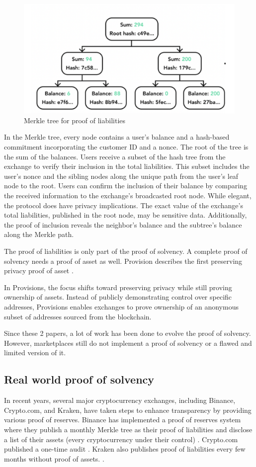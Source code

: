 \begin{figure}[H]
\centering
\includegraphics[width=130mm]{MerkleTreeLiabilities.png}
\caption{Merkle tree for proof of liabilities}
\label{overflow}
\end{figure}


In the Merkle tree, every node contains a user's balance and a hash-based commitment incorporating the customer ID and a nonce. The root of the tree is the sum of the balances.
Users receive a subset of the hash tree from the exchange to verify their inclusion in the total liabilities. This subset includes the user's nonce and the sibling nodes along the unique path from the user's leaf node to the root.
Users can confirm the inclusion of their balance by comparing the received information to the exchange's broadcasted root node.
While elegant, the protocol does have privacy implications. The exact value of the exchange's total liabilities, published in the root node, may be sensitive data.
Additionally, the proof of inclusion reveals the neighbor's balance and the subtree's balance along the Merkle path.

The proof of liabilities is only part of the proof of solvency. A complete proof of solvency needs a proof of asset as well.
Provision describes the first preserving privacy proof of asset \cite{DBBBCC15}.

In Provisions, the focus shifts toward preserving privacy while still proving ownership of assets.
Instead of publicly demonstrating control over specific addresses, Provisions enables exchanges to prove ownership of an anonymous subset of addresses sourced from the blockchain.

Since these 2 papers, a lot of work has been done to evolve the proof of solvency. However, marketplaces still do not implement a proof of solvency or a flawed and limited version of it.


\subsection{Real world proof of solvency}
In recent years, several major cryptocurrency exchanges, including Binance, Crypto.com, and Kraken, have taken steps to enhance transparency by providing various proof of reserves.
Binance has implemented a proof of reserves system where they publish a monthly Merkle tree as their proof of liabilities and disclose a list of their assets (every cryptocurrency under their control) \cite{BPR}.
Crypto.com published a one-time audit \cite{CC22}.
Kraken also publishes proof of liabilities every few months without proof of assets. \cite{BPR}.

